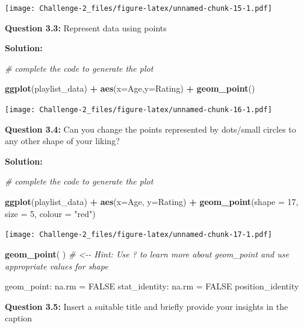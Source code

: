 \documentclass[
]{article}
\newenvironment{Shaded}{\begin{snugshade}}{\end{snugshade}}
\newcommand{\AttributeTok}[1]{\textcolor[rgb]{0.13,0.29,0.53}{#1}}
\newcommand{\CommentTok}[1]{\textcolor[rgb]{0.56,0.35,0.01}{\textit{#1}}}
\newcommand{\DecValTok}[1]{\textcolor[rgb]{0.00,0.00,0.81}{#1}}
\newcommand{\FunctionTok}[1]{\textcolor[rgb]{0.13,0.29,0.53}{\textbf{#1}}}
\newcommand{\NormalTok}[1]{#1}
\newcommand{\SpecialCharTok}[1]{\textcolor[rgb]{0.81,0.36,0.00}{\textbf{#1}}}
\newcommand{\StringTok}[1]{\textcolor[rgb]{0.31,0.60,0.02}{#1}}
\begin{document}
\texttt{[image: Challenge-2\_files/figure-latex/unnamed-chunk-15-1.pdf]}

\textbf{Question 3.3:} Represent data using points

\textbf{Solution:}

\begin{Shaded}
\begin{Highlighting}[]
\CommentTok{\# complete the code to generate the plot}

\FunctionTok{ggplot}\NormalTok{(playlist\_data) }\SpecialCharTok{+} \FunctionTok{aes}\NormalTok{(}\AttributeTok{x=}\NormalTok{Age,}\AttributeTok{y=}\NormalTok{Rating) }\SpecialCharTok{+} \FunctionTok{geom\_point}\NormalTok{()}
\end{Highlighting}
\end{Shaded}

\texttt{[image: Challenge-2\_files/figure-latex/unnamed-chunk-16-1.pdf]}

\textbf{Question 3.4:} Can you change the points represented by
dots/small circles to any other shape of your liking?

\textbf{Solution:}

\begin{Shaded}
\begin{Highlighting}[]
\CommentTok{\# complete the code to generate the plot}

\FunctionTok{ggplot}\NormalTok{(playlist\_data) }\SpecialCharTok{+} \FunctionTok{aes}\NormalTok{(}\AttributeTok{x=}\NormalTok{Age, }\AttributeTok{y=}\NormalTok{Rating) }\SpecialCharTok{+} \FunctionTok{geom\_point}\NormalTok{(}\AttributeTok{shape =} \DecValTok{17}\NormalTok{, }\AttributeTok{size =} \DecValTok{5}\NormalTok{, }\AttributeTok{colour =} \StringTok{"red"}\NormalTok{)}
\end{Highlighting}
\end{Shaded}

\texttt{[image: Challenge-2\_files/figure-latex/unnamed-chunk-17-1.pdf]}

\begin{Shaded}
\begin{Highlighting}[]
\FunctionTok{geom\_point}\NormalTok{( ) }\CommentTok{\# \textless{}{-}{-} Hint: Use ? to learn more about geom\_point and use appropriate values for shape}
\end{Highlighting}
\end{Shaded}

geom\_point: na.rm = FALSE stat\_identity: na.rm = FALSE
position\_identity

\textbf{Question 3.5:} Insert a suitable title and briefly provide your
insights in the caption
\end{document}
